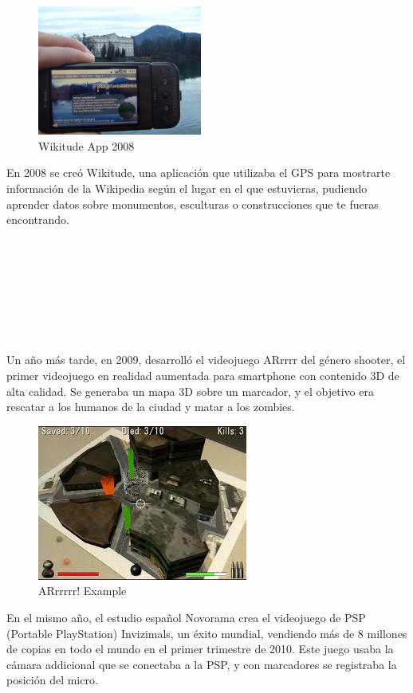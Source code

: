 \begin{figure}
    \centering
    \includegraphics[width=0.48\textwidth]{Images/Wikitude_Example.jpeg}
    \caption{Wikitude App 2008}
    \label{fig:wikitude2008}
\end{figure}
En 2008 se creó Wikitude, una aplicación que utilizaba el GPS para mostrarte información de la Wikipedia según el lugar en el que estuvieras, pudiendo aprender datos sobre monumentos, esculturas o construcciones que te fueras encontrando.\\
\\
\\
\\
\\
\\
\\
\\
\\

Un año más tarde, en 2009, desarrolló el videojuego ARrrrr del género shooter, el primer videojuego en realidad aumentada para smartphone con contenido 3D de alta calidad. Se generaba un mapa 3D sobre un marcador, y el objetivo era rescatar a los humanos de la ciudad y matar a los zombies. 
\begin{figure}[H]
    \centering
        \includegraphics[width=0.5\linewidth]{Images/Arrrr.jpeg}
        \caption{ARrrrrr! Example}
  \end{figure}
En el mismo año, el estudio español Novorama crea el videojuego de PSP (Portable PlayStation) Invizimals, un éxito mundial, vendiendo más de 8 millones de copias en todo el mundo en el primer trimestre de 2010. Este juego usaba la cámara addicional que se conectaba a la PSP, y con marcadores se registraba la posición del micro.

